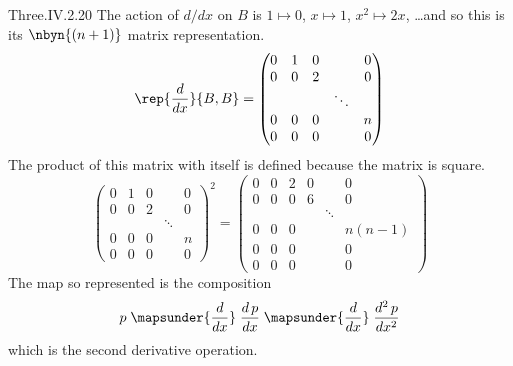 \begin{ans}{Three.IV.2.20}
      The action of $d/dx$ on $B$ is
      $1\mapsto0$, $x\mapsto 1$, $x^2\mapsto 2x$, \ldots and so
      this is its $\nbyn{(n+1)}$ matrix representation.
      \begin{equation*}
        \rep{\frac{d}{dx}}{B,B}=
        \begin{pmatrix}
          0  &1 &0  &  &0  \\
          0  &0 &2  &  &0  \\
             &  &   &\ddots\\
          0  &0 &0  &  &n  \\
          0  &0 &0  &  &0
        \end{pmatrix}
      \end{equation*}
      The product of this matrix with itself is defined because the matrix is
      square.
      \begin{equation*}
        \begin{pmatrix}
          0  &1 &0  &  &0  \\
          0  &0 &2  &  &0  \\
             &  &   &\ddots\\
          0  &0 &0  &  &n  \\
          0  &0 &0  &  &0
        \end{pmatrix}^2
        =
        \begin{pmatrix}
          0  &0 &2  &0  &        &0       \\
          0  &0 &0  &6  &        &0       \\
             &  &   &   &\ddots  &        \\
          0  &0 &0  &  &         &n(n-1)  \\
          0  &0 &0  &  &         &0       \\
          0  &0 &0  &  &         &0
        \end{pmatrix}
      \end{equation*}
      The map so represented is the composition
      \begin{equation*}
        p\;\mapsunder{\frac{d}{dx}}\;\frac{d\,p}{dx}
         \;\mapsunder{\frac{d}{dx}}\;\frac{d^2\,p}{dx^2}
      \end{equation*}
      which is the second derivative operation.
     
\end{ans}
